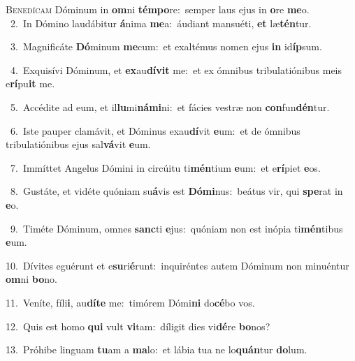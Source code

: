 \lettrine{\initial\textcolor{\initialcolor}{B}}{enedícam} Dóminum in \textbf{om}\-ni \textbf{tém}\-\textbf{po}re:~\star semper laus ejus in \textbf{o}\-re \textbf{me}\-o.\\
{\numbfont\textcolor{\numbcolor}{~2.}}~In Dómino laudábitur \textbf{á}\-nima \textbf{me}\-a:~\star áudiant mansuéti, \textbf{et} læ\-\textbf{tén}\-tur.\par
{\numbfont\textcolor{\numbcolor}{~3.}}~Magnificáte \textbf{Dó}\-minum \textbf{me}\-cum:~\star et exaltémus nomen ejus \textbf{in} id\-\textbf{íp}\-sum.\par
{\numbfont\textcolor{\numbcolor}{~4.}}~Exquisívi Dóminum, et \textbf{ex}\-au\-\textbf{dí}\-\textbf{vit} me:~\star et ex ómnibus tribulatiónibus meis e\-\textbf{rí}\-pu\textbf{it} me.\par
{\numbfont\textcolor{\numbcolor}{~5.}}~Accédite ad eum, et il\-\textbf{lu}\-mi\-\textbf{ná}\-\textbf{mi}ni:~\star et fácies vestræ non \textbf{con}\-fun\-\textbf{dén}\-tur.\par
{\numbfont\textcolor{\numbcolor}{~6.}}~Iste pauper clamávit, et Dóminus exau\-\textbf{dí}\-vit \textbf{e}\-um:~\star et de ómnibus tribulatiónibus ejus sal\-\textbf{vá}\-vit \textbf{e}\-um.\par
{\numbfont\textcolor{\numbcolor}{~7.}}~Immíttet Angelus Dómini in circúitu ti\-\textbf{mén}\-tium \textbf{e}\-um:~\star et e\-\textbf{rí}\-piet \textbf{e}\-os.\par
{\numbfont\textcolor{\numbcolor}{~8.}}~Gustáte, et vidéte quóniam su\-\textbf{á}\-vis est \textbf{Dó}\-\textbf{mi}nus:~\star beátus vir, qui \textbf{spe}\-rat in \textbf{e}\-o.\par
{\numbfont\textcolor{\numbcolor}{~9.}}~Timéte Dóminum, omnes \textbf{sanc}\-ti \textbf{e}\-jus:~\star quóniam non est inópia ti\-\textbf{mén}\-tibus \textbf{e}\-um.\par
{\numbfont\textcolor{\numbcolor}{10.}}~Dívites eguérunt et e\-\textbf{su}\-ri\-\textbf{é}\-runt:~\star inquiréntes autem Dóminum non minuéntur \textbf{om}\-ni \textbf{bo}\-no.\par
{\numbfont\textcolor{\numbcolor}{11.}}~Veníte, fíli\-\textbf{i}\-, au\-\textbf{dí}\-\textbf{te} me:~\star timórem Dómi\textbf{ni} do\-\textbf{cé}\-bo vos.\par
{\numbfont\textcolor{\numbcolor}{12.}}~Quis est homo \textbf{qui} vult \textbf{vi}\-tam:~\star díligit dies vi\-\textbf{dé}\-re \textbf{bo}\-nos?\par
{\numbfont\textcolor{\numbcolor}{13.}}~Próhibe linguam \textbf{tu}\-am a \textbf{ma}\-lo:~\star et lábia tua ne lo\-\textbf{quán}\-tur \textbf{do}\-lum.\par
